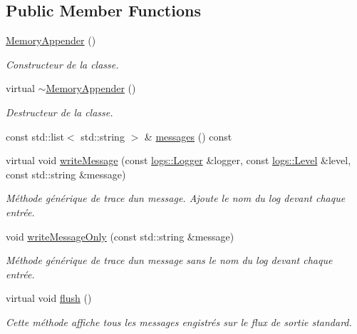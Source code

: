 \subsection*{Public Member Functions}
\begin{DoxyCompactItemize}
\item 
\mbox{\label{classlogs_1_1MemoryAppender_afd3435bd16488320fc7ba2e4466f32b7}} 
\hyperlink{classlogs_1_1MemoryAppender_afd3435bd16488320fc7ba2e4466f32b7}{Memory\+Appender} ()
\begin{DoxyCompactList}\small\item\em Constructeur de la classe. \end{DoxyCompactList}\item 
\mbox{\label{classlogs_1_1MemoryAppender_aad5cff73a112f433a5766cc0c8da3ef6}} 
virtual \hyperlink{classlogs_1_1MemoryAppender_aad5cff73a112f433a5766cc0c8da3ef6}{$\sim$\+Memory\+Appender} ()
\begin{DoxyCompactList}\small\item\em Destructeur de la classe. \end{DoxyCompactList}\item 
const std\+::list$<$ std\+::string $>$ \& \hyperlink{classlogs_1_1MemoryAppender_a04b4a02cf45fa2f60306f1805d464418}{messages} () const
\item 
virtual void \hyperlink{classlogs_1_1MemoryAppender_a478c866b07f63f1f89c347b4465834bc}{write\+Message} (const \hyperlink{classlogs_1_1Logger}{logs\+::\+Logger} \&logger, const \hyperlink{classlogs_1_1Level}{logs\+::\+Level} \&level, const std\+::string \&message)
\begin{DoxyCompactList}\small\item\em Méthode générique de trace d\textquotesingle{}un message. Ajoute le nom du log devant chaque entrée. \end{DoxyCompactList}\item 
void \hyperlink{classlogs_1_1MemoryAppender_a6456fc6c33dd29be1964a2c39b5d329f}{write\+Message\+Only} (const std\+::string \&message)
\begin{DoxyCompactList}\small\item\em Méthode générique de trace d\textquotesingle{}un message sans le nom du log devant chaque entrée. \end{DoxyCompactList}\item 
\mbox{\label{classlogs_1_1MemoryAppender_a90fd2058402bceaff5e896ceee438df4}} 
virtual void \hyperlink{classlogs_1_1MemoryAppender_a90fd2058402bceaff5e896ceee438df4}{flush} ()
\begin{DoxyCompactList}\small\item\em Cette méthode affiche tous les messages engistrés sur le flux de sortie standard. \end{DoxyCompactList}\end{DoxyCompactItemize}
